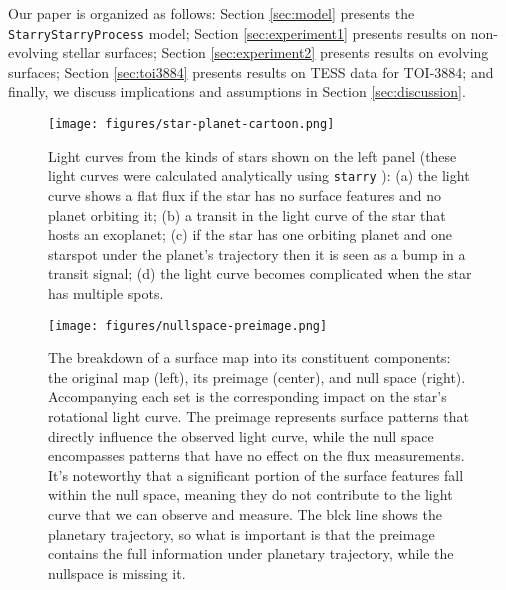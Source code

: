 \documentclass[twocolumn]{aastex631}
\begin{document}
Our paper is organized as follows: Section \ref{sec:model} presents the \texttt{StarryStarryProcess} model; 
Section \ref{sec:experiment1} presents results on non-evolving stellar surfaces; Section \ref{sec:experiment2} 
presents results on evolving surfaces; Section \ref{sec:toi3884} presents results on TESS data for TOI-3884; and finally,
 we discuss implications and assumptions in Section \ref{sec:discussion}.

\begin{figure}[hbt!]
    \texttt{[image: figures/star-planet-cartoon.png]}
        \caption{Light curves from the kinds of stars shown on the left panel (these light curves were calculated analytically 
        using \texttt{starry} \citep{Luger2019}): (a) the light curve shows a flat flux if the star has no surface features and no planet orbiting it; 
        (b) a transit in the light curve of the star that hosts an exoplanet; (c) if the star has one orbiting planet and one starspot under the planet's 
        trajectory then it is seen as a bump in a transit signal; (d) the light curve becomes complicated when the star has multiple spots.}
        \label{fig:cartoon}
    \end{figure}

\begin{figure*}[hbt!]
    \texttt{[image: figures/nullspace-preimage.png]}
        \caption{The breakdown of a surface map into its constituent components: the original map (left), its preimage (center), and null space (right). 
        Accompanying each set is the corresponding impact on the star's rotational light curve. The preimage represents surface patterns that 
        directly influence the observed light curve, while the null space encompasses patterns that have no effect on the flux measurements. 
        It's noteworthy that a significant portion of the surface features fall within the null space, meaning they do not contribute to the light curve 
        that we can observe and measure. The blck line shows the planetary trajectory, so what is important is that the preimage contains the full
        information under planetary trajectory, while the nullspace is missing it.}
        \label{fig:nullspace}
    \end{figure*}

%
\end{document}
